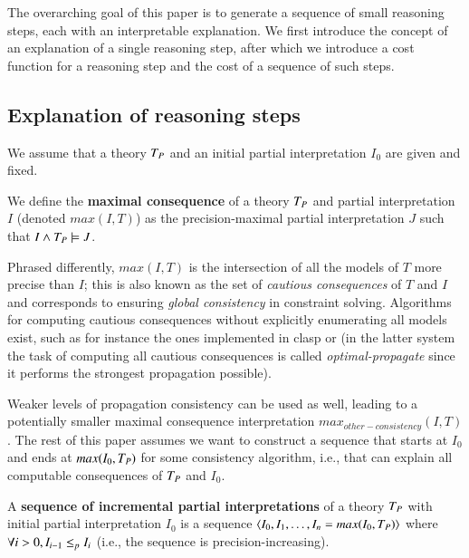 
The overarching goal of this paper is to generate a sequence of small reasoning steps, each with an interpretable explanation. 
We first introduce the concept of an explanation of a single reasoning step, after which we introduce a cost function for a reasoning step and the cost of a sequence of such steps. 

\subsection{Explanation of reasoning steps}
We assume that a theory $T_P$ and an initial partial interpretation $I_0$ are given and fixed. 

\begin{definition}
We define the \textbf{maximal consequence} of a theory $T_P$ and partial interpretation $I$ (denoted $max(I,T)$) as the precision-maximal partial interpretation $J$ such that  $I \wedge T_P \models J$. 
\end{definition}

Phrased differently, $max(I,T)$ is the intersection of all the models of $T$ more precise than $I$; this is also known as the set of \emph{cautious consequences} of $T$ and $I$ and corresponds to ensuring \emph{global consistency} in constraint solving. 
Algorithms for computing cautious consequences without explicitly enumerating all models exist, such as for instance the ones implemented in clasp \cite{DBLP:conf/lpnmr/GebserKS09} or \idp \cite{IDP} (in the latter system the task of computing all cautious consequences is called \emph{optimal-propagate} since it performs the strongest propagation possible).

Weaker levels of propagation consistency can be used as well, leading to a potentially smaller maximal consequence interpretation $max_{other-consistency}(I,T)$. 
The rest of this paper assumes we want to construct a sequence that starts at $I_0$ and ends at $max(I_0,T_P)$ for some consistency algorithm, i.e., that can explain all computable consequences of $T_P$ and $I_0$. 
\begin{definition}
A \textbf{sequence of incremental partial interpretations} of a theory $T_P$ with initial partial interpretation $I_0$ is a sequence $\langle I_0, I_1, \ldots, I_n  = max(I_0,T_P)\rangle$ where $\forall i>0, I_{i-1} \leq_p I_{i}$ (i.e., the sequence is precision-increasing).
\end{definition} 

